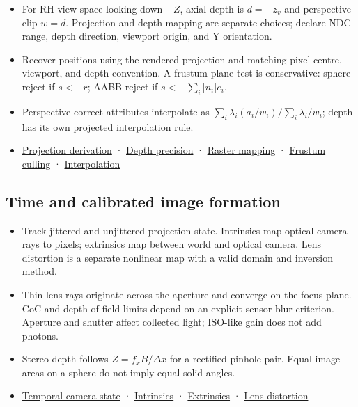 \begin{itemize}
\tightlist
\item
  For RH view space looking down \(-Z\), axial depth is \(d=-z_v\) and perspective clip \(w=d\). Projection and depth mapping are separate choices; declare NDC range, depth direction, viewport origin, and Y orientation.
\item
  Recover positions using the rendered projection and matching pixel centre, viewport, and depth convention. A frustum plane test is conservative: sphere reject if \(s<-r\); AABB reject if \(s<-\sum_i|n_i|e_i\).
\item
  Perspective-correct attributes interpolate as \(\sum_i\lambda_i(a_i/w_i)/\sum_i\lambda_i/w_i\); depth has its own projected interpolation rule.
\item
  \hyperref[02-foundations-ii-ch033-projection-turns-rays-into-clip-coordinates]{Projection derivation} · \hyperref[02-foundations-ii-ch033-depth-is-a-numerical-design-choice]{Depth precision} · \hyperref[02-foundations-ii-ch033-a-projected-point-still-needs-a-raster-convention]{Raster mapping} · \hyperref[02-foundations-ii-ch034-the-viewing-volume-is-six-half-spaces]{Frustum culling} · \hyperref[02-foundations-ii-ch034-raster-interpolation-remembers-homogeneous-depth]{Interpolation}
\end{itemize}

\subsection{Time and calibrated image formation}\label{appendix-a2b71a18f5a2-time-and-calibrated-image-formation}

\hypertarget{appendix-a2b71a18f5a2-time-and-calibrated-image-formation}{}

\begin{itemize}
\tightlist
\item
  Track jittered and unjittered projection state. Intrinsics map optical-camera rays to pixels; extrinsics map between world and optical camera. Lens distortion is a separate nonlinear map with a valid domain and inversion method.
\item
  Thin-lens rays originate across the aperture and converge on the focus plane. CoC and depth-of-field limits depend on an explicit sensor blur criterion. Aperture and shutter affect collected light; ISO-like gain does not add photons.
\item
  Stereo depth follows \(Z=f_xB/\Delta x\) for a rectified pinhole pair. Equal image areas on a sphere do not imply equal solid angles.
\item
  \hyperref[02-foundations-ii-ch036-a-camera-image-changes-over-time]{Temporal camera state} · \hyperref[02-foundations-ii-ch034-intrinsics-map-optical-rays-to-pixels]{Intrinsics} · \hyperref[02-foundations-ii-ch035-extrinsics-place-the-optical-camera-in-the-world]{Extrinsics} · \hyperref[02-foundations-ii-ch035-real-lenses-bend-the-pinhole-image]{Lens distortion}
\end{itemize}


